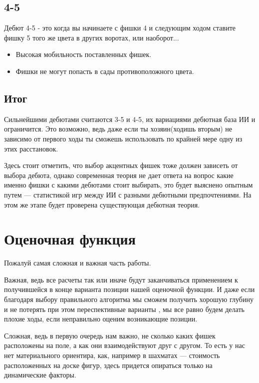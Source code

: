\documentclass[a4paper,12pt]{diplom}
\begin{document}
\section{4-5}

Дебют 4-5 - это когда вы начинаете с фишки 4 и следующим ходом ставите фишку 5 того же цвета в других воротах, или наоборот...

\begin{itemize}
	\item Высокая мобильность поставленных фишек.
	\item Фишки не могут попасть в сады противоположного цвета.
\end{itemize}

\section{Итог}

Сильнейшими дебютами считаются 3-5 и 4-5, их вариациями дебютная база ИИ и ограничится. Это возможно, ведь даже если ты хозяин(ходишь вторым) не зависимо от первого ходы ты сможешь использовать по крайней мере одну из этих расстановок.

Здесь стоит отметить, что выбор акцентных фишек тоже должен зависеть от выбора дебюта, однако современная теория не дает ответа на вопрос какие именно фишки с какими дебютами стоит выбирать, это будет выяснено опытным путем — статистикой игр между ИИ с разными дебютными предпочтениями. На этом же этапе будет проверена существующая дебютная теория.

\chapter{Оценочная функция}

Пожалуй самая сложная и важная часть работы. 

Важная, ведь все расчеты так или иначе будут заканчиваться применением к получившейся в конце варианта позиции нашей оценочной функции. И даже если благодаря выбору правильного алгоритма мы сможем получить хорошую глубину и не потерять при этом переспективные варианты , мы все равно будем делать плохие ходы, если неправильно оценим возникающие позиции. 

Сложная, ведь в первую очередь нам важно, не сколько каких фишек расположены на поле, а как они взаимодействуют друг с другом. То есть у нас нет материального ориентира, как, например в шахматах — стоимость расположенных на доске фигур, здесь придется опираться только на динамические факторы.
\end{document}
